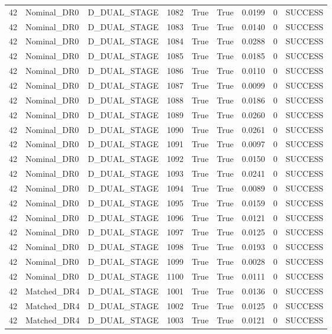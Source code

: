 \documentclass[11pt,a4paper,oneside]{book}
\begin{document}
\begin{longtable}{l l l l l l l l l}
42 & Nominal\_DR0 & D\_DUAL\_STAGE & 1082 & True & True & 0.0199 & 0 & SUCCESS \\
42 & Nominal\_DR0 & D\_DUAL\_STAGE & 1083 & True & True & 0.0140 & 0 & SUCCESS \\
42 & Nominal\_DR0 & D\_DUAL\_STAGE & 1084 & True & True & 0.0288 & 0 & SUCCESS \\
42 & Nominal\_DR0 & D\_DUAL\_STAGE & 1085 & True & True & 0.0185 & 0 & SUCCESS \\
42 & Nominal\_DR0 & D\_DUAL\_STAGE & 1086 & True & True & 0.0110 & 0 & SUCCESS \\
42 & Nominal\_DR0 & D\_DUAL\_STAGE & 1087 & True & True & 0.0099 & 0 & SUCCESS \\
42 & Nominal\_DR0 & D\_DUAL\_STAGE & 1088 & True & True & 0.0186 & 0 & SUCCESS \\
42 & Nominal\_DR0 & D\_DUAL\_STAGE & 1089 & True & True & 0.0260 & 0 & SUCCESS \\
42 & Nominal\_DR0 & D\_DUAL\_STAGE & 1090 & True & True & 0.0261 & 0 & SUCCESS \\
42 & Nominal\_DR0 & D\_DUAL\_STAGE & 1091 & True & True & 0.0097 & 0 & SUCCESS \\
42 & Nominal\_DR0 & D\_DUAL\_STAGE & 1092 & True & True & 0.0150 & 0 & SUCCESS \\
42 & Nominal\_DR0 & D\_DUAL\_STAGE & 1093 & True & True & 0.0241 & 0 & SUCCESS \\
42 & Nominal\_DR0 & D\_DUAL\_STAGE & 1094 & True & True & 0.0089 & 0 & SUCCESS \\
42 & Nominal\_DR0 & D\_DUAL\_STAGE & 1095 & True & True & 0.0159 & 0 & SUCCESS \\
42 & Nominal\_DR0 & D\_DUAL\_STAGE & 1096 & True & True & 0.0121 & 0 & SUCCESS \\
42 & Nominal\_DR0 & D\_DUAL\_STAGE & 1097 & True & True & 0.0125 & 0 & SUCCESS \\
42 & Nominal\_DR0 & D\_DUAL\_STAGE & 1098 & True & True & 0.0193 & 0 & SUCCESS \\
42 & Nominal\_DR0 & D\_DUAL\_STAGE & 1099 & True & True & 0.0028 & 0 & SUCCESS \\
42 & Nominal\_DR0 & D\_DUAL\_STAGE & 1100 & True & True & 0.0111 & 0 & SUCCESS \\
42 & Matched\_DR4 & D\_DUAL\_STAGE & 1001 & True & True & 0.0136 & 0 & SUCCESS \\
42 & Matched\_DR4 & D\_DUAL\_STAGE & 1002 & True & True & 0.0125 & 0 & SUCCESS \\
42 & Matched\_DR4 & D\_DUAL\_STAGE & 1003 & True & True & 0.0121 & 0 & SUCCESS \\

\end{longtable}
\end{document}
